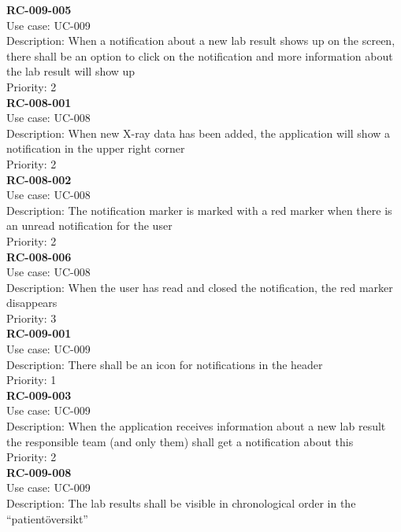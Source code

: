 \textbf{RC-009-005} \\
Use case: UC-009 \\
Description: When a notification about a new lab result shows up on the screen, there shall be an option to click on the notification and more information about the lab result will show up \\
Priority: 2 \\
\newline
\textbf{RC-008-001} \\
Use case: UC-008 \\
Description: When new X-ray data has been added, the application will show a notification in the upper right corner  \\
Priority: 2 \\
\newline
\textbf{RC-008-002} \\
Use case: UC-008 \\
Description: The notification marker is marked with a red marker when there is an unread notification for the user \\
Priority: 2 \\
\newline
\textbf{RC-008-006} \\
Use case: UC-008 \\
Description: When the user has read and closed the notification, the red marker disappears \\
Priority: 3 \\
\newline
\textbf{RC-009-001} \\
Use case: UC-009 \\
Description: There shall be an icon for notifications in the header \\
Priority: 1 \\
\newline
\textbf{RC-009-003} \\
Use case: UC-009 \\
Description: When the application receives information about a new lab result the responsible team (and only them) shall get a notification about this\\
Priority: 2 \\
\newline
\textbf{RC-009-008} \\
Use case: UC-009 \\
Description: The lab results shall be visible in chronological order in the “patientöversikt” \\
